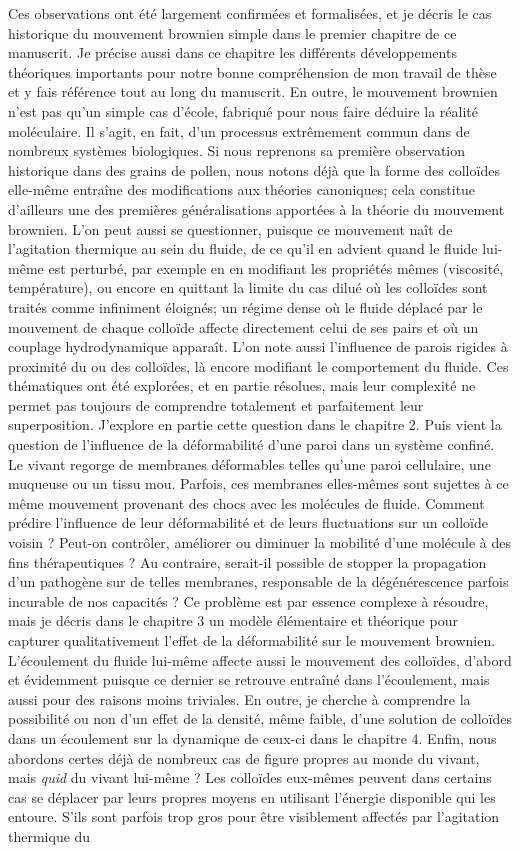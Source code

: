 Ces observations ont été largement confirmées et formalisées, et je décris le cas historique du mouvement brownien simple dans le premier chapitre de ce manuscrit. Je précise aussi dans ce chapitre les différents développements théoriques importants pour notre bonne compréhension de mon travail de thèse et y fais référence tout au long du manuscrit. En outre, le mouvement brownien n'est pas qu'un simple cas d'école, fabriqué pour nous faire déduire la réalité moléculaire. Il s'agit, en fait, d'un processus extrêmement commun dans de nombreux systèmes biologiques. Si nous reprenons sa première observation historique dans des grains de pollen, nous notons déjà que la forme des colloïdes elle-même entraîne des modifications aux théories canoniques; cela constitue d'ailleurs une des premières généralisations apportées à la théorie du mouvement brownien. L'on peut aussi se questionner, puisque ce mouvement naît de l'agitation thermique au sein du fluide, de ce qu'il en advient quand le fluide lui-même est perturbé, par exemple en en modifiant les propriétés mêmes (viscosité, température), ou encore en quittant la limite du cas dilué où les colloïdes sont traités comme infiniment éloignés; un régime dense où le fluide déplacé par le mouvement de chaque colloïde affecte directement celui de ses pairs et où un couplage hydrodynamique apparaît. L'on note aussi l'influence de parois rigides à proximité du ou des colloïdes, là encore modifiant le comportement du fluide. Ces thématiques ont été explorées, et en partie résolues, mais leur complexité ne permet pas toujours de comprendre totalement et parfaitement leur superposition. J'explore en partie cette question dans le chapitre 2. Puis vient la question de l'influence de la déformabilité d'une paroi dans un système confiné. Le vivant regorge de membranes déformables telles qu'une paroi cellulaire, une muqueuse ou un tissu mou. Parfois, ces membranes elles-mêmes sont sujettes à ce même mouvement provenant des chocs avec les molécules de fluide. Comment prédire l'influence de leur déformabilité et de leurs fluctuations sur un colloïde voisin ? Peut-on contrôler, améliorer ou diminuer la mobilité d'une molécule à des fins thérapeutiques ? Au contraire, serait-il possible de stopper la propagation d'un pathogène sur de telles membranes, responsable de la dégénérescence parfois incurable de nos capacités ? Ce problème est par essence complexe à résoudre, mais je décris dans le chapitre 3 un modèle élémentaire et théorique pour capturer qualitativement l'effet de la déformabilité sur le mouvement brownien. L'écoulement du fluide lui-même affecte aussi le mouvement des colloïdes, d'abord et évidemment puisque ce dernier se retrouve entraîné dans l'écoulement, mais aussi pour des raisons moins triviales. En outre, je cherche à comprendre la possibilité ou non d'un effet de la densité, même faible, d'une solution de colloïdes dans un écoulement sur la dynamique de ceux-ci dans le chapitre 4. Enfin, nous abordons certes déjà de nombreux cas de figure propres au monde du vivant, mais \emph{quid} du vivant lui-même ? Les colloïdes eux-mêmes peuvent dans certains cas se déplacer par leurs propres moyens en utilisant l'énergie disponible qui les entoure. S'ils sont parfois trop gros pour être visiblement affectés par l'agitation thermique du 